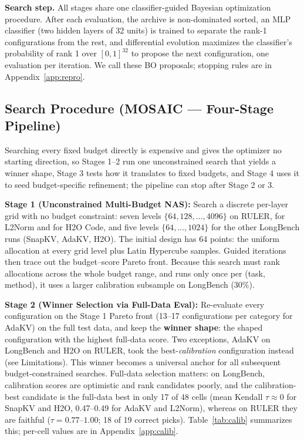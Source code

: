 \documentclass[11pt]{article}
\begin{document}
\textbf{Search step.} All stages share one classifier-guided Bayesian optimization procedure. After each evaluation, the archive is non-dominated sorted, an MLP classifier (two hidden layers of 32 units) is trained to separate the rank-1 configurations from the rest, and differential evolution maximizes the classifier's probability of rank 1 over $[0,1]^{32}$ to propose the next configuration, one evaluation per iteration. We call these BO proposals; stopping rules are in Appendix~\ref{app:repro}.

\subsection{Search Procedure (MOSAIC — Four-Stage Pipeline)}

Searching every fixed budget directly is expensive and gives the optimizer no starting direction, so Stages 1--2 run one unconstrained search that yields a winner shape, Stage 3 tests how it translates to fixed budgets, and Stage 4 uses it to seed budget-specific refinement; the pipeline can stop after Stage 2 or 3.

\textbf{Stage 1 (Unconstrained Multi-Budget NAS):} Search a discrete per-layer grid with no budget constraint: seven levels $\{64,128,\dots,4096\}$ on RULER, for L2Norm and for H2O Code, and five levels $\{64,\dots,1024\}$ for the other LongBench runs (SnapKV, AdaKV, H2O). The initial design has 64 points: the uniform allocation at every grid level plus Latin Hypercube samples. Guided iterations then trace out the budget--score Pareto front. Because this search must rank allocations across the whole budget range, and runs only once per (task, method), it uses a larger calibration subsample on LongBench (30\%).

\textbf{Stage 2 (Winner Selection via Full-Data Eval):} Re-evaluate every configuration on the Stage 1 Pareto front (13--17 configurations per category for AdaKV) on the full test data, and keep the \textbf{winner shape}: the shaped configuration with the highest full-data score. Two exceptions, AdaKV on LongBench and H2O on RULER, took the best-\emph{calibration} configuration instead (see Limitations). This winner becomes a universal anchor for all subsequent budget-constrained searches. Full-data selection matters: on LongBench, calibration scores are optimistic and rank candidates poorly, and the calibration-best candidate is the full-data best in only 17 of 48 cells (mean Kendall $\tau \approx 0$ for SnapKV and H2O, 0.47--0.49 for AdaKV and L2Norm), whereas on RULER they are faithful ($\tau = 0.77$--$1.00$; 18 of 19 correct picks). Table~\ref{tab:calib} summarizes this; per-cell values are in Appendix~\ref{app:calib}.
\end{document}
